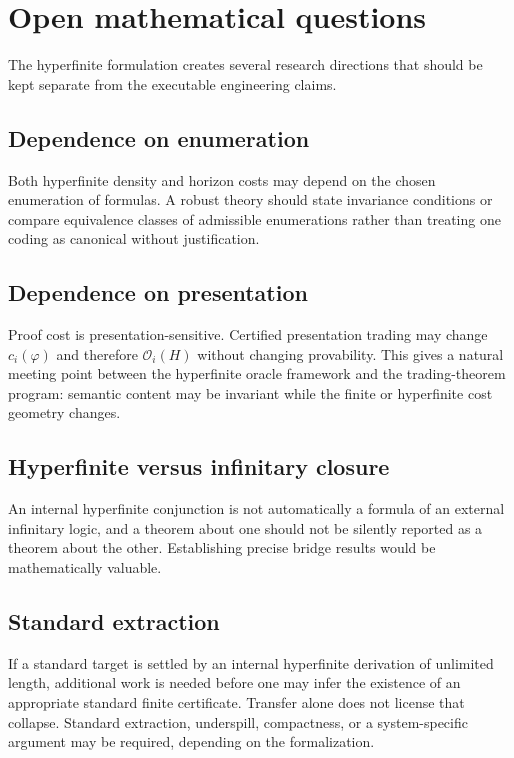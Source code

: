 \documentclass[11pt]{article}
\newcommand{\Ocal}{\mathcal{O}}
\begin{document}
\section{Open mathematical questions}

The hyperfinite formulation creates several research directions that should be kept separate from the executable engineering claims.

\subsection{Dependence on enumeration}

Both hyperfinite density and horizon costs may depend on the chosen enumeration of formulas. A robust theory should state invariance conditions or compare equivalence classes of admissible enumerations rather than treating one coding as canonical without justification.

\subsection{Dependence on presentation}

Proof cost is presentation-sensitive. Certified presentation trading may change $c_i(\varphi)$ and therefore $\Ocal_i(H)$ without changing provability. This gives a natural meeting point between the hyperfinite oracle framework and the trading-theorem program: semantic content may be invariant while the finite or hyperfinite cost geometry changes.

\subsection{Hyperfinite versus infinitary closure}

An internal hyperfinite conjunction is not automatically a formula of an external infinitary logic, and a theorem about one should not be silently reported as a theorem about the other. Establishing precise bridge results would be mathematically valuable.

\subsection{Standard extraction}

If a standard target is settled by an internal hyperfinite derivation of unlimited length, additional work is needed before one may infer the existence of an appropriate standard finite certificate. Transfer alone does not license that collapse. Standard extraction, underspill, compactness, or a system-specific argument may be required, depending on the formalization.
\end{document}
